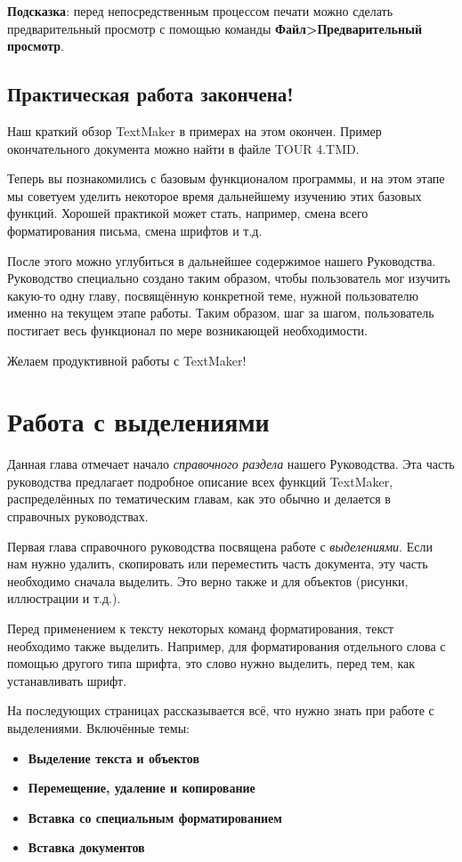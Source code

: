 ﻿\documentclass[a4paper,10pt]{article}
\begin{document}
\textbf{Подсказка}: перед непосредственным процессом печати можно сделать предварительный просмотр с помощью команды \textbf{Файл>Предварительный просмотр}.

\subsection{Практическая работа закончена!}
Наш краткий обзор TextMaker в примерах на этом окончен. Пример окончательного документа можно найти в файле TOUR 4.TMD.

Теперь вы познакомились с базовым функционалом программы, и на этом этапе мы советуем уделить некоторое время дальнейшему изучению этих базовых функций. Хорошей практикой может стать, например, смена всего форматирования письма, смена шрифтов и т.д.

После этого можно углубиться в дальнейшее содержимое нашего Руководства. Руководство специально создано таким образом, чтобы пользователь мог изучить какую-то одну главу, посвящённую конкретной теме, нужной пользователю именно на текущем этапе работы. Таким образом, шаг за шагом, пользователь постигает весь функционал по мере возникающей необходимости.

Желаем продуктивной работы с TextMaker!

\section{Работа с выделениями} \label{sec:рсв}
Данная глава отмечает начало \textit{справочного раздела} нашего Руководства. Эта часть руководства предлагает подробное описание всех функций TextMaker, распределённых по тематическим главам, как это обычно и делается в справочных руководствах. 

Первая глава справочного руководства посвящена работе с \textit{выделениями}. Если нам нужно удалить, скопировать или переместить часть документа, эту часть необходимо сначала выделить. Это верно также и для объектов (рисунки, иллюстрации и т.д.).

Перед применением к тексту некоторых команд форматирования, текст необходимо также выделить. Например, для форматирования отдельного слова с помощью другого типа шрифта, это слово нужно выделить, перед тем, как устанавливать шрифт.

На последующих страницах рассказывается всё, что нужно знать при работе с выделениями. Включённые темы:

\begin{itemize}
 \item \textbf{Выделение текста и объектов}
 \item \textbf{Перемещение, удаление и копирование}
 \item \textbf{Вставка со специальным форматированием}
 \item \textbf{Вставка документов}
\end{itemize}
\end{document}
